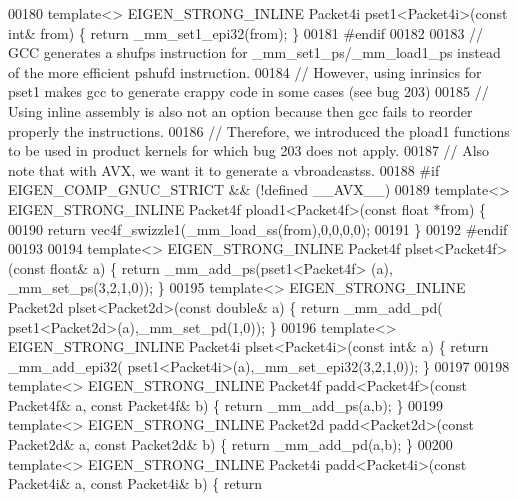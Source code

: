 \begin{DoxyCode}
00180 \textcolor{keyword}{template}<> EIGEN\_STRONG\_INLINE Packet4i pset1<Packet4i>(\textcolor{keyword}{const} \textcolor{keywordtype}{int}&    from) \{ \textcolor{keywordflow}{return} \_mm\_set1\_epi32(from); 
      \}
00181 \textcolor{preprocessor}{#endif}
00182 
00183 \textcolor{comment}{// GCC generates a shufps instruction for \_mm\_set1\_ps/\_mm\_load1\_ps instead of the more efficient pshufd
       instruction.}
00184 \textcolor{comment}{// However, using inrinsics for pset1 makes gcc to generate crappy code in some cases (see bug 203)}
00185 \textcolor{comment}{// Using inline assembly is also not an option because then gcc fails to reorder properly the instructions.}
00186 \textcolor{comment}{// Therefore, we introduced the pload1 functions to be used in product kernels for which bug 203 does not
       apply.}
00187 \textcolor{comment}{// Also note that with AVX, we want it to generate a vbroadcastss.}
00188 \textcolor{preprocessor}{#if EIGEN\_COMP\_GNUC\_STRICT && (!defined \_\_AVX\_\_)}
00189 \textcolor{keyword}{template}<> EIGEN\_STRONG\_INLINE Packet4f pload1<Packet4f>(\textcolor{keyword}{const} \textcolor{keywordtype}{float} *from) \{
00190   \textcolor{keywordflow}{return} vec4f\_swizzle1(\_mm\_load\_ss(from),0,0,0,0);
00191 \}
00192 \textcolor{preprocessor}{#endif}
00193   
00194 \textcolor{keyword}{template}<> EIGEN\_STRONG\_INLINE Packet4f plset<Packet4f>(\textcolor{keyword}{const} \textcolor{keywordtype}{float}& a) \{ \textcolor{keywordflow}{return} \_mm\_add\_ps(pset1<Packet4f>
      (a), \_mm\_set\_ps(3,2,1,0)); \}
00195 \textcolor{keyword}{template}<> EIGEN\_STRONG\_INLINE Packet2d plset<Packet2d>(\textcolor{keyword}{const} \textcolor{keywordtype}{double}& a) \{ \textcolor{keywordflow}{return} \_mm\_add\_pd(
      pset1<Packet2d>(a),\_mm\_set\_pd(1,0)); \}
00196 \textcolor{keyword}{template}<> EIGEN\_STRONG\_INLINE Packet4i plset<Packet4i>(\textcolor{keyword}{const} \textcolor{keywordtype}{int}& a) \{ \textcolor{keywordflow}{return} \_mm\_add\_epi32(
      pset1<Packet4i>(a),\_mm\_set\_epi32(3,2,1,0)); \}
00197 
00198 \textcolor{keyword}{template}<> EIGEN\_STRONG\_INLINE Packet4f padd<Packet4f>(\textcolor{keyword}{const} Packet4f& a, \textcolor{keyword}{const} Packet4f& b) \{ \textcolor{keywordflow}{return} 
      \_mm\_add\_ps(a,b); \}
00199 \textcolor{keyword}{template}<> EIGEN\_STRONG\_INLINE Packet2d padd<Packet2d>(\textcolor{keyword}{const} Packet2d& a, \textcolor{keyword}{const} Packet2d& b) \{ \textcolor{keywordflow}{return} 
      \_mm\_add\_pd(a,b); \}
00200 \textcolor{keyword}{template}<> EIGEN\_STRONG\_INLINE Packet4i padd<Packet4i>(\textcolor{keyword}{const} Packet4i& a, \textcolor{keyword}{const} Packet4i& b) \{ \textcolor{keywordflow}{return} 

\end{DoxyCode}
